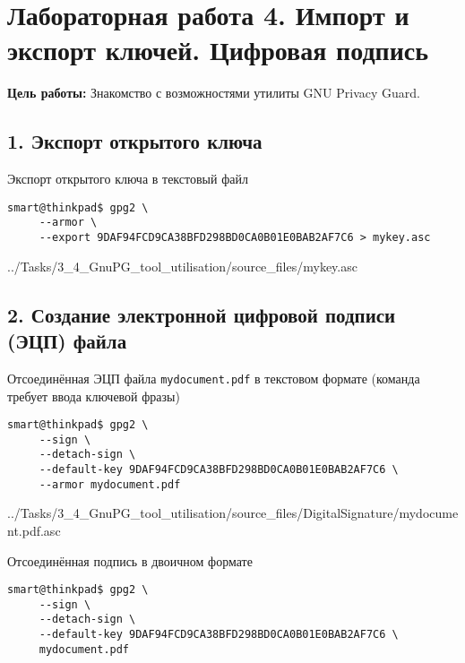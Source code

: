 \chapter*{Лабораторная работа 4. Импорт и экспорт ключей. Цифровая подпись}

\textbf{Цель работы:} Знакомство с возможностями утилиты GNU Privacy Guard.

\section*{1. Экспорт открытого ключа}

Экспорт открытого ключа в текстовый файл
\begin{Verbatim}[frame=single,breaklines=true,breakanywhere=true]
    smart@thinkpad$ gpg2 \
     --armor \
     --export 9DAF94FCD9CA38BFD298BD0CA0B01E0BAB2AF7C6 > mykey.asc
\end{Verbatim}


{../Tasks/3_4_GnuPG_tool_utilisation/source_files/mykey.asc}

\section*{2. Создание электронной цифровой подписи (ЭЦП) файла}

Отсоединённая ЭЦП файла \texttt{mydocument.pdf} в текстовом формате (команда требует ввода ключевой фразы)
\begin{Verbatim}[frame=single,breaklines=true,breakanywhere=true]
    smart@thinkpad$ gpg2 \
     --sign \
     --detach-sign \
     --default-key 9DAF94FCD9CA38BFD298BD0CA0B01E0BAB2AF7C6 \
     --armor mydocument.pdf
\end{Verbatim}


{../Tasks/3_4_GnuPG_tool_utilisation/source_files/DigitalSignature/mydocument.pdf.asc}

Отсоединённая подпись в двоичном формате

\begin{Verbatim}[frame=single,breaklines=true,breakanywhere=true]
    smart@thinkpad$ gpg2 \
     --sign \
     --detach-sign \
     --default-key 9DAF94FCD9CA38BFD298BD0CA0B01E0BAB2AF7C6 \
     mydocument.pdf
\end{Verbatim}

